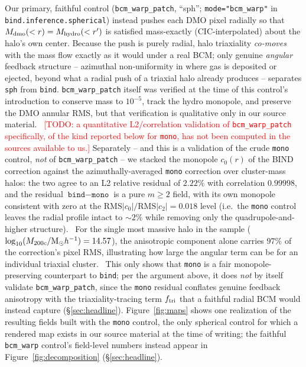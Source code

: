 \documentclass[11pt]{article}
\newcommand{\Msun}{{\rm M}_\odot}
\newcommand{\Mhalo}{M_{200c}}
\newcommand{\todo}[1]{\textcolor{red}{[TODO: #1]}}
\newcommand{\ftri}{f_{\rm tri}}
\begin{document}
Our primary, faithful control (\texttt{bcm\_warp\_patch}, ``sph'';
\texttt{mode="bcm\_warp"} in \texttt{bind.inference.spherical}) instead
pushes each DMO pixel radially so that $M_{\rm dmo}(<r)=M_{\rm
hydro}(<r')$ is satisfied mass-exactly (CIC-interpolated) about the
halo's own center. Because the push is purely radial, halo triaxiality
\emph{co-moves} with the mass flow exactly as it would under a real BCM;
only genuine \emph{angular} feedback structure -- azimuthal
non-uniformity in where gas is deposited or ejected, beyond what a radial
push of a triaxial halo already produces -- separates \texttt{sph} from
\texttt{bind}. \texttt{bcm\_warp\_patch} itself was verified at the time of
this control's introduction to conserve mass to $10^{-5}$, track the
hydro monopole, and preserve the DMO annular RMS, but that verification
is qualitative only in our source material.\ %
\todo{a quantitative L2/correlation validation of \texttt{bcm\_warp\_patch}
specifically, of the kind reported below for \texttt{mono}, has not been
computed in the sources available to us.}
Separately -- and this is a validation of the crude \texttt{mono} control,
\emph{not} of \texttt{bcm\_warp\_patch} -- we stacked the monopole $c_0(r)$
of the BIND correction against the azimuthally-averaged \texttt{mono}
correction over cluster-mass halos: the two agree to an L2 relative
residual of $2.22\%$ with correlation $0.99998$, and the residual
$\texttt{bind}-\texttt{mono}$ is a pure $m\!\geq\!2$ field, with its own
monopole consistent with zero at the
$\mathrm{RMS}|c_0|/\mathrm{RMS}|c_2|=0.018$ level (i.e.\ the \texttt{mono}
control leaves the radial profile intact to $\sim\!2\%$ while removing
only the quadrupole-and-higher structure).\ %
For the single most massive halo in the sample ($\log_{10}(\Mhalo/\Msun
h^{-1})=14.57$), the anisotropic component alone carries $97\%$ of the
correction's pixel RMS, illustrating how large the angular term can be
for an individual triaxial cluster.\ %
This only shows that \texttt{mono} is a fair monopole-preserving
counterpart to \texttt{bind}; per the argument above, it does \emph{not}
by itself validate \texttt{bcm\_warp\_patch}, since the \texttt{mono}
residual conflates genuine feedback anisotropy with the
triaxiality-tracing term $\ftri$ that a faithful radial BCM would instead
capture (\S\ref{sec:headline}). Figure~\ref{fig:maps} shows one
realization of the resulting fields built with the \texttt{mono} control,
the only spherical control for which a rendered map exists in our source
material at the time of writing; the faithful \texttt{bcm\_warp}
control's field-level numbers instead appear in
Figure~\ref{fig:decomposition} (\S\ref{sec:headline}).\ %
\end{document}
